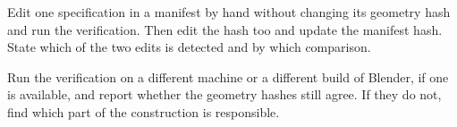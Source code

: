 \begin{exercise}[23.3: Tamper]
Edit one specification in a manifest by hand without changing its geometry hash and run the verification. Then edit the hash too and update the manifest hash. State which of the two edits is detected and by which comparison.
\end{exercise}

\begin{exercise}
Run the verification on a different machine or a different build of Blender, if one is available, and report whether the geometry hashes still agree. If they do not, find which part of the construction is responsible.
\end{exercise}
